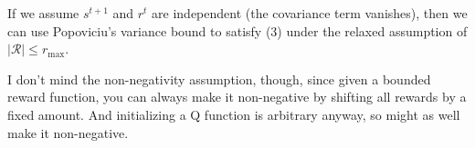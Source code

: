 \documentclass[twoside,10pt]{report}
\begin{document}
\begin{note}[]
If we assume $s^{t+1}$ and $r^{t}$ are independent (the covariance term vanishes), then we can use Popoviciu's variance bound to satisfy (3) under the relaxed assumption of $|\mathcal{R}| \leq r_{\text{max}}$.

I don't mind the non-negativity assumption, though, since given a bounded reward function, you can always make it non-negative by shifting all rewards by a fixed amount. And initializing a Q function is arbitrary anyway, so might as well make it non-negative.
\end{note}
\end{document}
